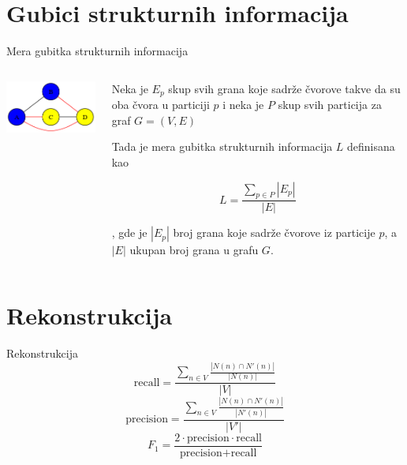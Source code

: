 \documentclass{beamer}
\begin{document}
\section{Gubici strukturnih informacija}
\begin{frame}{Mera gubitka strukturnih informacija}
    \begin{columns}
		\begin{column}{0.5\textwidth}
            \includegraphics[width=\textwidth]{dot/graf.png}
		\end{column}
		\begin{column}{0.5\textwidth}
            Neka je $ E_p $ skup svih grana koje sadrže čvorove takve da su oba čvora u particiji $ p $  i neka je $ P $ skup svih particija za graf $ G = (V, E) $
            
            Tada je mera gubitka strukturnih informacija $ L $ definisana kao
            
            $$ L = \frac{\sum_{p \in P} |E_p|}{|E|} $$
            
            , gde je $ |E_p| $ broj grana koje sadrže čvorove iz particije $ p $, a $ |E| $ ukupan broj grana u grafu $ G $.
		\end{column}
	\end{columns}
\end{frame}


\section{Rekonstrukcija}
\begin{frame}{Rekonstrukcija}
    $$ \text{recall} = \frac{\sum_{n \in V} \frac{|N(n) \cap N'(n)|}{|N(n)|}}{|V|} $$
    $$ \text{precision} = \frac{\sum_{n \in V} \frac{|N(n) \cap N'(n)|}{|N'(n)|}}{|V'|} $$
    $$ F_1 = \frac{2 \cdot \text{precision} \cdot \text{recall}}{\text{precision} + \text{recall}} $$
\end{frame}
\end{document}
